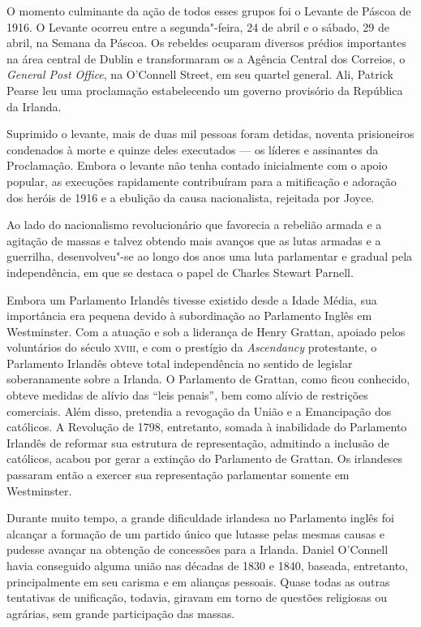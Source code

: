 O momento culminante da ação de todos esses grupos foi o Levante de
Páscoa de 1916. O Levante ocorreu entre a segunda"-feira, 24 de
abril e o sábado, 29 de abril, na Semana da Páscoa. Os rebeldes
ocuparam diversos prédios importantes na área central de Dublin e
transformaram os a Agência Central dos Correios, o \textit{General Post
Office}, na O’Connell Street, em seu quartel general. Ali, Patrick
Pearse leu uma proclamação estabelecendo um governo provisório da
República da Irlanda. 

Suprimido o levante, mais de duas mil pessoas foram detidas, noventa
prisioneiros condenados à morte e quinze deles executados --- os líderes
e assinantes da Proclamação. Embora o levante não tenha contado
inicialmente com o apoio popular, as execuções rapidamente contribuíram
para a mitificação e adoração dos heróis de 1916 e a ebulição da causa
nacionalista, rejeitada por Joyce. 

Ao lado do nacionalismo revolucionário que favorecia a rebelião armada e
a agitação de massas e talvez obtendo mais avanços que as lutas armadas
e a guerrilha, desenvolveu"-se ao longo dos anos uma luta parlamentar e
gradual pela independência, em que se destaca o papel de Charles Stewart
Parnell.  

Embora um Parlamento Irlandês tivesse existido desde a Idade Média, sua
importância era pequena devido à subordinação ao Parlamento Inglês em
Westminster. Com a atuação e sob a liderança de Henry Grattan, apoiado
pelos voluntários do século \textsc{xviii}, e com o prestígio da
\textit{Ascendancy} protestante, o Parlamento Irlandês obteve total
independência no sentido de legislar soberanamente sobre a Irlanda. O
Parlamento de Grattan, como ficou conhecido, obteve medidas de alívio
das “leis penais”, bem como alívio de restrições comerciais. Além
disso, pretendia a revogação da União e a Emancipação dos católicos. A
Revolução de 1798, entretanto, somada à inabilidade do Parlamento
Irlandês de reformar sua estrutura de representação, admitindo a
inclusão de católicos, acabou por gerar a extinção do Parlamento de
Grattan. Os irlandeses passaram então a exercer sua representação
parlamentar somente em Westminster.

Durante muito tempo, a grande dificuldade irlandesa no Parlamento inglês
foi alcançar a formação de um partido único que lutasse pelas mesmas
causas e pudesse avançar na obtenção de concessões para a Irlanda.
Daniel O’Connell havia conseguido alguma união nas décadas de 1830 e
1840, baseada, entretanto, principalmente em seu carisma e em alianças
pessoais. Quase todas as outras tentativas de unificação, todavia,
giravam em torno de questões religiosas ou agrárias, sem grande
participação das massas. 


